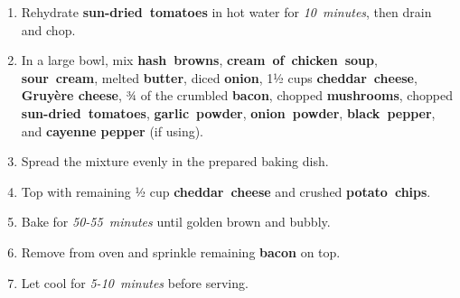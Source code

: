 \documentclass[11pt,letterpaper]{article}
\begin{document}
\begin{enumerate}
    \item Rehydrate \textbf{sun-dried~tomatoes} in hot water for \textit{10~minutes}, then drain and chop.
    \item In a large bowl, mix \textbf{hash~browns}, \textbf{cream~of~chicken~soup}, \textbf{sour~cream}, melted \textbf{butter}, diced \textbf{onion}, 1½ cups \textbf{cheddar~cheese}, \textbf{Gruyère cheese}, ¾ of the crumbled \textbf{bacon}, chopped \textbf{mushrooms}, chopped \textbf{sun-dried~tomatoes}, \textbf{garlic~powder}, \textbf{onion~powder}, \textbf{black~pepper}, and \textbf{cayenne pepper} (if using).
    \item Spread the mixture evenly in the prepared baking dish.
    \item Top with remaining ½ cup \textbf{cheddar~cheese} and crushed \textbf{potato~chips}.
    \item Bake for \textit{50-55~minutes} until golden brown and bubbly.
    \item Remove from oven and sprinkle remaining \textbf{bacon} on top.
    \item Let cool for \textit{5-10~minutes} before serving.
\end{enumerate}
\end{document}
